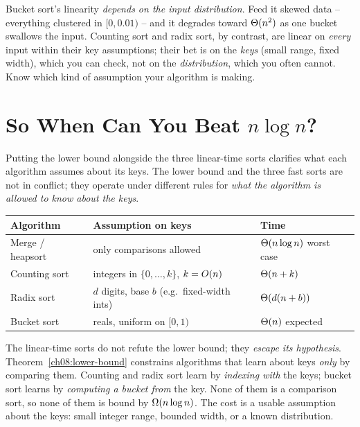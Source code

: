 \begin{trapbox}
Bucket sort's linearity \emph{depends on the input distribution}. Feed it skewed data -- everything clustered in $[0, 0.01)$ -- and it
degrades toward $\Theta(n^2)$ as one bucket swallows the input. Counting sort and
radix sort, by contrast, are linear on \emph{every} input within their key
assumptions; their bet is on the \emph{keys} (small range, fixed width), which
you can check, not on the \emph{distribution}, which you often cannot. Know
which kind of assumption your algorithm is making.
\end{trapbox}

\section{So When Can You Beat $n\log n$?}

Putting the lower bound alongside the three linear-time sorts clarifies what
each algorithm assumes about its keys. The lower bound and the three
fast sorts are not in conflict; they operate under different rules for
\emph{what the algorithm is allowed to know about the keys}.

\begin{center}
\begin{tabular}{lll}
\toprule
Algorithm & Assumption on keys & Time\\
\midrule
Merge / heapsort & only comparisons allowed & $\Theta(n\log n)$ worst case\\
Counting sort & integers in $\{0,\dots,k\}$, $k=O(n)$ & $\Theta(n+k)$\\
Radix sort & $d$ digits, base $b$ (e.g.\ fixed-width ints) & $\Theta(d(n+b))$\\
Bucket sort & reals, uniform on $[0,1)$ & $\Theta(n)$ expected\\
\bottomrule
\end{tabular}
\end{center}

\begin{focusbox}
The linear-time sorts do not refute the lower bound; they \emph{escape its
hypothesis}. Theorem~\ref{ch08:lower-bound} constrains algorithms that learn
about keys \emph{only} by comparing them. Counting and radix sort learn by
\emph{indexing with} the keys; bucket sort learns by \emph{computing a bucket
from} the key. None of them is a comparison sort, so none of them is bound by
$\Omega(n\log n)$. The cost is a usable assumption about the keys:
small integer range, bounded width, or a known distribution.
\end{focusbox}

